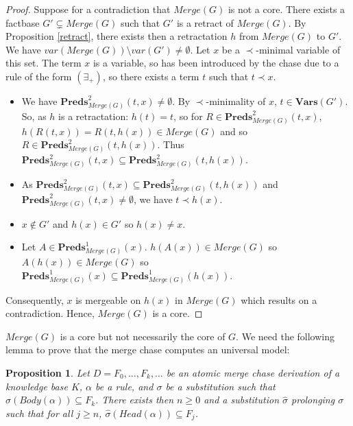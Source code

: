 \documentclass{article}
\newtheorem{proposition}{Proposition}[section]
\theoremstyle{definition}
\theoremstyle{remark}
\newcommand{\Vars}{\textbf{Vars}}
\newcommand{\Preds}{\textbf{Preds}}
\newcommand{\Merge}{\textit{Merge}}
\begin{document}
\begin{proof}
Suppose for a contradiction that $\Merge(G)$ is not a core. There exists a factbase $G' \subsetneq \Merge(G)$ such that $G'$ is a retract of $\Merge(G)$. By Proposition \ref{retract}, there exists then a retractation $h$ from $\Merge(G)$ to $G'$. We have $var(\Merge(G))\setminus var(G') \neq \emptyset$. Let $x$ be a $\prec$-minimal variable of this set. The term $x$ is a variable, so has been introduced by the chase due to a rule of the form $(\exists_+)$, so there exists a term $t$ such that $t \prec x$. 
\begin{itemize}
\item We have $\Preds^2_{\Merge(G)}(t,x) \neq \emptyset$. By $\prec$-minimality of $x$, $t \in \Vars(G')$. So, as $h$ is a retractation: $h(t) = t$, so for $R \in \Preds^2_{\Merge(G)}(t,x)$, $h(R(t,x)) = R(t,h(x)) \in \Merge(G)$ and so $R \in \Preds^2_{\Merge(G)}(t,h(x))$. Thus $\Preds^2_{\Merge(G)}(t,x) \subseteq \Preds^2_{\Merge(G)}(t,h(x))$.
\item As $\Preds^2_{\Merge(G)}(t,x) \subseteq \Preds^2_{\Merge(G)}(t,h(x))$ and $\Preds^2_{\Merge(G)}(t,x) \neq \emptyset$, we have $t \prec h(x)$.
\item $x \notin G'$ and $h(x) \in G'$ so $h(x) \neq x$. 
\item Let $A \in \Preds^1_{\Merge(G)}(x)$. $h(A(x)) \in \Merge(G)$ so $A(h(x)) \in \Merge(G)$ so $\Preds^1_{\Merge(G)}(x) \subseteq \Preds^1_{\Merge(G)}(h(x))$. 
\end{itemize}
Consequently, $x$ is mergeable on $h(x)$ in $\Merge(G)$ which results on a contradiction. Hence, $\Merge(G)$ is a core.
\end{proof}	

$\Merge(G)$ is a core but not necessarily the core of $G$. We need the following lemma to prove that the merge chase computes an universal model:

\begin{proposition} \label{lemme}
	Let $D=F_0,\ldots,F_k, \ldots$ be an atomic merge chase derivation of a knowledge base $K$, $\alpha$ be a rule, and $\sigma$ be a substitution such that $\sigma(\textit{Body}(\alpha)) \subseteq F_k$. There exists then $n \geq 0$ and a substitution $\hat \sigma$ prolonging $\sigma$ such that for all $j \geq n$, $\hat \sigma(\textit{Head}(\alpha)) \subseteq F_j$. 
\end{proposition}
\end{document}
